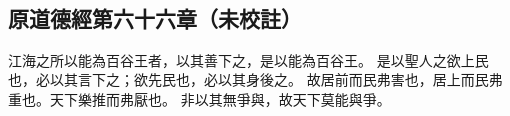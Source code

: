 ﻿%
%

\chapter{~}

\section{原道德經第六十六章（未校註）}

\begin{withgezhu}

\zhsong


江海之所以能為百谷王者，以其善下之，是以能為百谷王。
是以聖人之欲上民也，必以其言下之；欲先民也，必以其身後之。
故居前而民弗害也，居上而民弗重也。\textcolor{tongjia-color}{天下樂推而弗厭也}。
非以其無爭與，故天下莫能與爭。

\end{withgezhu}
